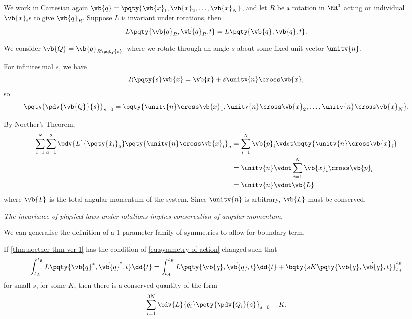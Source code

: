\begin{example}
    We work in Cartesian again \(\vb{q} = \pqty{\vb{x}_1, \vb{x}_2, \ldots, \vb{x}_N}\), and let \(R\) be a rotation in \(\RR^3\) acting on individual \(\vb{x}_i\)s to give \(\vb{q}_R\). Suppose \(L\) is invariant under rotations, then
    \[
        L\pqty{\vb{q}_R, \dot{\vb{q}}_R, t} = L \pqty{\vb{q}, \dot{\vb{q}}, t}.
    \]

    We consider \(\vb{Q} = \vb{q}_{R\pqty{s}}\), where we rotate through an angle \(s\) about some fixed unit vector \(\unitv{n}\).

    For infinitesimal \(s\), we have
    \[
        R\pqty{s} \vb{x} = \vb{x} + s \unitv{n} \cross \vb{x},
    \]
    so
    \[
        \pqty{\pdv{\vb{Q}}{s}}_{s = 0} = \pqty{\unitv{n} \cross \vb{x}_1, \unitv{n} \cross \vb{x}_2, \ldots, \unitv{n} \cross \vb{x}_N}.
    \]
    
    By Noether's Theorem,
    \begin{align*}
        \sum_{i = 1}^{N} \sum_{a = 1}^{3} \pdv{L}{\pqty{\dot{x}_i}_a} \pqty{\unitv{n} \cross \vb{x}_i}_{a} &= \sum_{i = 1}^{N} \vb{p}_i \vdot \pqty{\unitv{n} \cross \vb{x}_i} \\
        &= \unitv{n} \vdot \sum_{i = 1}^{N} \vb{x}_i \cross \vb{p}_i \\
        &= \unitv{n} \vdot \vb{L}
    \end{align*}
    where \(\vb{L}\) is the total angular momentum of the system. Since \(\unitv{n}\) is arbitrary, \(\vb{L}\) must be conserved.

        \textit{The invariance of physical laws under rotations implies conservation of angular momentum.}
\end{example}

We can generalise the definition of a 1-parameter family of symmetries to allow for boundary term.

\begin{corollary}
    If \autoref{thm:noether-thm-ver-1} has the condition of \eqref{eq:symmetry-of-action} changed such that
    \begin{equation}
        \label{eq:conserved-symmetry-with-boundary-term}%
        \int_{t_A}^{t_B} L \pqty{\vb{q}^{\ast}, \dot{\vb{q}}^{\ast}, t} \dd{t} = \int_{t_A}^{t_B} L \pqty{\vb{q}, \dot{\vb{q}}, t} \dd{t} + \bqty{s K \pqty{\vb{q}, \dot{\vb{q}}, t}}_{t_A}^{t_B}
    \end{equation}
    for small \(s\), for some \(K\), then there is a conserved quantity of the form
    \[
        \sum_{i = 1}^{3N} \pdv{L}{\dot{q}_i} \pqty{\pdv{Q_i}{s}}_{s = 0} - K.
    \]
\end{corollary}

